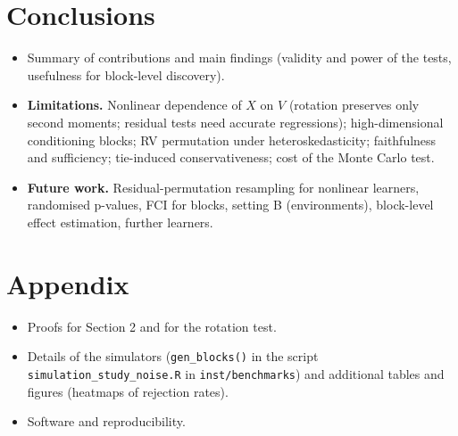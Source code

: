 \documentclass[10pt,leqno]{amsart}
\newcommand{\fn}[1]{\texttt{#1}}            %
\begin{document}
\section{Conclusions}
\begin{itemize}
\item Summary of contributions and main findings (validity and power of the tests,
  usefulness for block-level discovery).
\item \textbf{Limitations.} Nonlinear dependence of $X$ on $V$ (rotation preserves
  only second moments; residual tests need accurate regressions); high-dimensional
  conditioning blocks; RV permutation under heteroskedasticity; faithfulness and
  sufficiency; tie-induced conservativeness; cost of the Monte Carlo test.
\item \textbf{Future work.} Residual-permutation resampling for nonlinear learners,
  randomised p-values, FCI for blocks, setting B (environments), block-level effect
  estimation, further learners.
\end{itemize}

\appendix
\section*{Appendix}
\begin{itemize}
\item Proofs for Section 2 and for the rotation test.
\item Details of the simulators (\fn{gen\_blocks()} in the script
  \texttt{simulation\_study\_noise.R} in \texttt{inst/benchmarks}) and additional
  tables and figures (heatmaps of rejection rates).
\item Software and reproducibility.
\end{itemize}
\end{document}
